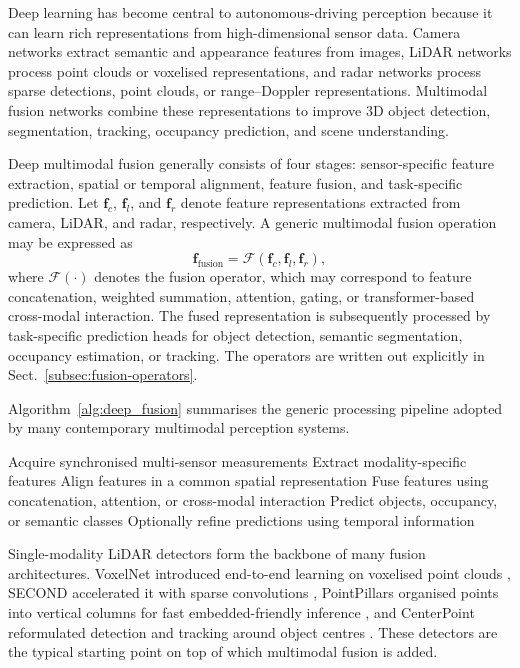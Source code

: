 \documentclass[graybox,envcountchap]{style/SNmono}
\begin{document}
Deep learning has become central to autonomous-driving perception because it can learn rich representations from high-dimensional sensor data. Camera networks extract semantic and appearance features from images, LiDAR networks process point clouds or voxelised representations, and radar networks process sparse detections, point clouds, or range--Doppler representations. Multimodal fusion networks combine these representations to improve 3D object detection, segmentation, tracking, occupancy prediction, and scene understanding.




Deep multimodal fusion generally consists of four stages: sensor-specific feature extraction, spatial or temporal alignment, feature fusion, and task-specific prediction. Let $\mathbf{f}_c$, $\mathbf{f}_l$, and $\mathbf{f}_r$ denote feature representations extracted from camera, LiDAR, and radar, respectively. A generic multimodal fusion operation may be expressed as
\begin{equation}
\mathbf{f}_{\mathrm{fusion}}
=
\mathcal{F}
\left(
\mathbf{f}_c,
\mathbf{f}_l,
\mathbf{f}_r
\right),
\label{eq:deep_fusion}
\end{equation}
where $\mathcal{F}(\cdot)$ denotes the fusion operator, which may correspond to feature concatenation, weighted summation, attention, gating, or transformer-based cross-modal interaction. The fused representation is subsequently processed by task-specific prediction heads for object detection, semantic segmentation, occupancy estimation, or tracking. The operators are written out explicitly in Sect.~\ref{subsec:fusion-operators}.

Algorithm~\ref{alg:deep_fusion} summarises the generic processing pipeline adopted by many contemporary multimodal perception systems.

\begin{algorithm}[t]
\caption{Generic Deep Multimodal Fusion Pipeline}
\label{alg:deep_fusion}
\begin{algorithmic}[1]
\State Acquire synchronised multi-sensor measurements
\State Extract modality-specific features
\State Align features in a common spatial representation
\State Fuse features using concatenation, attention, or cross-modal interaction
\State Predict objects, occupancy, or semantic classes
\State Optionally refine predictions using temporal information
\end{algorithmic}
\end{algorithm}

Single-modality LiDAR detectors form the backbone of many fusion architectures. VoxelNet introduced end-to-end learning on voxelised point clouds \cite{zhou2018_voxelnet}, SECOND accelerated it with sparse convolutions \cite{yan2018_second}, PointPillars organised points into vertical columns for fast embedded-friendly inference \cite{lang2019_pointpillars}, and CenterPoint reformulated detection and tracking around object centres \cite{yin2021_centerpoint}. These detectors are the typical starting point on top of which multimodal fusion is added.
\end{document}
